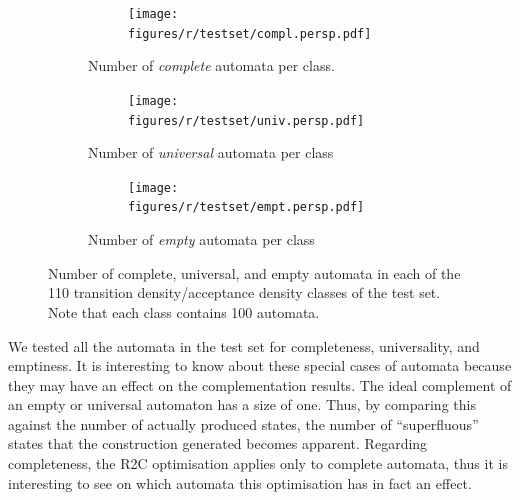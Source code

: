 \renewcommand{\tabcolsep}{0.05cm}   %
\renewcommand{\arraystretch}{1.05}
\begin{figure}[htb!]
  \centering
  \begin{subfigure}{\textwidth}
    \begin{subtable}{0.47\textwidth}
    
    \end{subtable}
    \hfill
    \begin{subfigure}{0.52\textwidth}
    \texttt{[image: figures/r/testset/compl.persp.pdf]}
    \end{subfigure}
  \caption{Number of \textit{complete} automata per class.}
  \end{subfigure}

 \begin{subfigure}{\textwidth}
    \begin{subtable}{0.47\textwidth}
    
    \end{subtable}
    \hfill
    \begin{subfigure}{0.52\textwidth}
    \texttt{[image: figures/r/testset/univ.persp.pdf]}
    \end{subfigure}
  \caption{Number of \textit{universal} automata per class}
  \end{subfigure}

  \begin{subfigure}{\textwidth}
    \begin{subtable}{0.47\textwidth}
    
    \end{subtable}
    \hfill
    \begin{subfigure}{0.52\textwidth}
    \texttt{[image: figures/r/testset/empt.persp.pdf]}
    \end{subfigure}
  \caption{Number of \textit{empty} automata per class}
  \end{subfigure}
\caption{Number of complete, universal, and empty automata in each of the 110 transition density/acceptance density classes of the \goal{} test set. Note that each class contains 100 automata.}
\label{testset_analysis}
\end{figure}
\tablestyle  %

We tested all the automata in the \goal{} test set for completeness, universality, and emptiness. It is interesting to know about these special cases of automata because they may have an effect on the complementation results. The ideal complement of an empty or universal automaton has a size of one. Thus, by comparing this against the number of actually produced states, the number of ``superfluous'' states that the construction generated becomes apparent. Regarding completeness, the R2C optimisation applies only to complete automata, thus it is interesting to see on which automata this optimisation has in fact an effect.

